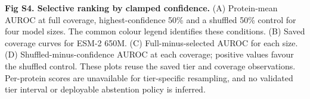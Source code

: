 \caption{{\bf Fig S4. Selective ranking by clamped confidence.} (A) Protein-mean AUROC at full coverage, highest-confidence 50\% and a shuffled 50\% control for four model sizes. The common colour legend identifies these conditions. (B) Saved coverage curves for ESM-2 650M. (C) Full-minus-selected AUROC for each size. (D) Shuffled-minus-confidence AUROC at each coverage; positive values favour the shuffled control. These plots reuse the saved tier and coverage observations. Per-protein scores are unavailable for tier-specific resampling, and no validated tier interval or deployable abstention policy is inferred.}
